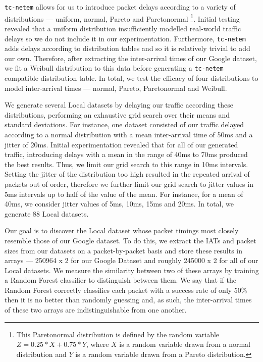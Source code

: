 \documentclass[msc,deptreport, cs]{infthesis} %
\begin{document}
\texttt{tc-netem} allows for us to introduce packet delays according to a variety of distributions --- uniform, normal, Pareto and Paretonormal \footnote{This Paretonormal distribution is defined by the random variable $Z = 0.25*X + 0.75*Y$, where $X$ is a random variable drawn from a normal distribution and $Y$ is a random variable drawn from a Pareto distribution.}.  Initial testing revealed that a uniform distribution insufficiently modelled real-world traffic delays so we do not include it in our experimentation. Furthermore, \texttt{tc-netem} adds delays according to distribution tables and so it is relatively trivial to add our own. Therefore, after extracting the inter-arrival times of our Google dataset, we fit a Weibull distribution to this data before generating a \texttt{tc-netem} compatible distribution table. In total, we test the efficacy of four distributions to model inter-arrival times --- normal, Pareto, Paretonormal and Weibull.

We generate several Local datasets by delaying our traffic according these distributions, performing an exhaustive grid search over their means and standard deviations. For instance, one dataset consisted of our traffic delayed according to a normal distribution with a mean inter-arrival time of 50ms and a jitter of 20ms. Initial experimentation revealed that for all of our generated traffic, introducing delays with a mean in the range of 40ms to 70ms produced the best results. Thus, we limit our grid search to this range in 10ms intervals. Setting the jitter of the distribution too high resulted in the repeated arrival of packets out of order, therefore we further limit our grid search to jitter values in 5ms intervals up to half of the value of the mean. For instance, for a mean of 40ms, we consider jitter values of 5ms, 10ms, 15ms and 20ms. In total, we generate 88 Local datasets.

Our goal is to discover the Local dataset whose packet timings most closely resemble those of our Google dataset. To do this, we extract the IATs and packet sizes from our datasets on a packet-by-packet basis and store these results in arrays --- 250964 x 2 for our Google Dataset and roughly 245000 x 2 for all of our Local datasets. We measure the similarity between two of these arrays by training a Random Forest classifier to distinguish between them. We say that if the Random Forest correctly classifies each packet with a success rate of only 50\% then it is no better than randomly guessing and, as such, the inter-arrival times of these two arrays are indistinguishable from one another.
\end{document}
